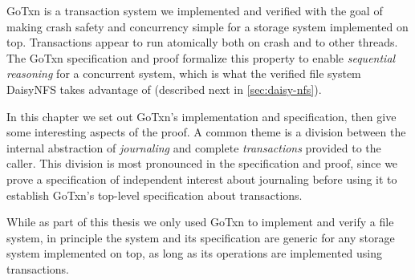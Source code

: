 GoTxn is a transaction system we implemented and verified with the goal of
making crash safety and concurrency simple for a storage system implemented on
top. Transactions appear to run atomically both on crash and to other threads.
The GoTxn specification and proof formalize this property to enable
\emph{sequential reasoning} for a concurrent system, which is what the verified
file system DaisyNFS takes advantage of (described next in
\cref{sec:daisy-nfs}).

In this chapter we set out GoTxn's implementation and specification, then give
some interesting aspects of the proof. A common theme is a division between the
internal abstraction of \emph{journaling} and complete \emph{transactions}
provided to the caller. This division is most pronounced in the specification
and proof, since we prove a specification of independent interest about
journaling before using it to establish GoTxn's top-level specification about
transactions.

While as part of this thesis we only used GoTxn to implement and verify a file
system, in principle the system and its specification are generic for any
storage system implemented on top, as long as its operations are implemented
using transactions.

%



%






